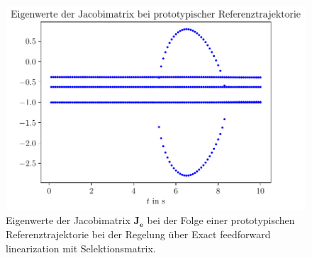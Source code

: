 \begin{figure}[ht]
	\begin{center}
		\includegraphics[scale=1]{Pictures/feedforward_lin_selec_ljapunov1}
	\end{center}
	\caption[Eigenwerte der Jacobimatrix bei Trajektorienfolge mit Regelung über Exact feedforward linearization (Selektionsmatrix)]
	{Eigenwerte der Jacobimatrix $\mathbf{J}_{\dot{\mathbf{e}}}$ bei der Folge einer prototypischen Referenztrajektorie bei der Regelung über Exact feedforward linearization mit Selektionsmatrix.}
	\label{fig_feedforward_selec_controller_ljapunov1}
\end{figure}

